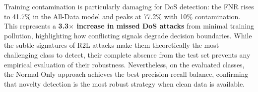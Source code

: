     Training contamination is particularly damaging for DoS detection: the FNR rises to 41.7\% in the All-Data model and peaks at 77.2\% with 10\% contamination.
    This represents a \textbf{3.3$\times$ increase in missed DoS attacks} from minimal training pollution, highlighting how conflicting signals degrade decision boundaries.
    While the subtle signatures of R2L attacks make them theoretically the most challenging class to detect, their complete absence from the test set prevents any empirical evaluation of their robustness.
    Nevertheless, on the evaluated classes, the Normal-Only approach achieves the best precision-recall balance, confirming that novelty detection is the most robust strategy when clean data is available.
